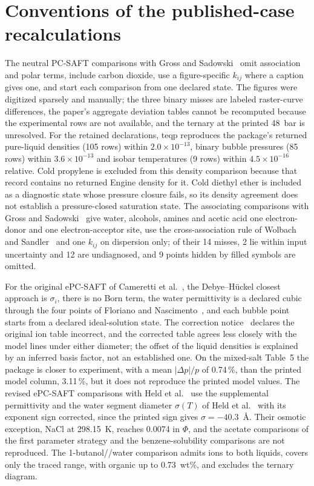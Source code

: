 \section{Conventions of the published-case recalculations}
\label{sec:si-reproductions}
The neutral PC-SAFT comparisons with Gross and Sadowski~\citep{Gross2001} omit association and polar terms, include carbon dioxide, use a figure-specific $k_{ij}$ where a caption gives one, and start each comparison from one declared state.
The figures were digitized sparsely and manually; the three binary misses are labeled raster-curve differences, the paper's aggregate deviation tables cannot be recomputed because the experimental rows are not available, and the ternary at the printed 48~bar is unresolved.
For the retained declarations, teqp reproduces the package's returned pure-liquid densities (105 rows) within $2.0\times10^{-13}$, binary bubble pressures (85 rows) within $3.6\times10^{-13}$ and isobar temperatures (9 rows) within $4.5\times10^{-16}$ relative.
Cold propylene is excluded from this density comparison because that record contains no returned Engine density for it.
Cold diethyl ether is included as a diagnostic state whose pressure closure fails, so its density agreement does not establish a pressure-closed saturation state.
The associating comparisons with Gross and Sadowski~\citep{Gross2002} give water, alcohols, amines and acetic acid one electron-donor and one electron-acceptor site, use the cross-association rule of Wolbach and Sandler~\citep{wolbachUsingMolecularOrbital1998} and one $k_{ij}$ on dispersion only; of their 14 misses, 2 lie within input uncertainty and 12 are undiagnosed, and 9 points hidden by filled symbols are omitted.

For the original ePC-SAFT of Cameretti et al.~\citep{Cameretti2005}, the Debye--H\"uckel closest approach is $\sigma_i$, there is no Born term, the water permittivity is a declared cubic through the four points of Floriano and Nascimento~\citep{florianoDielectricConstantDensity2004}, and each bubble point starts from a declared ideal-solution state.
The correction notice~\citep{camerettiModelingAqueousElectrolyte2005} declares the original ion table incorrect, and the corrected table agrees less closely with the model lines under either diameter; the offset of the liquid densities is explained by an inferred basis factor, not an established one.
On the mixed-salt Table~5 the package is closer to experiment, with a mean $\lvert\Delta p\rvert/p$ of 0.74\,\%, than the printed model column, 3.11\,\%, but it does not reproduce the printed model values.
The revised ePC-SAFT comparisons with Held et al.~\citep{Held2014} use the supplemental permittivity and the water segment diameter $\sigma(T)$ of Held et al.~\citep{Held2008} with its exponent sign corrected, since the printed sign gives $\sigma=-40.3$~\AA.
Their osmotic exception, NaCl at 298.15~K, reaches 0.0074 in $\Phi$, and the acetate comparisons of the first parameter strategy and the benzene-solubility comparisons are not reproduced.
The 1-butanol//water comparison admits ions to both liquids, covers only the traced range, with organic  up to 0.73~wt\%, and excludes the ternary diagram.

